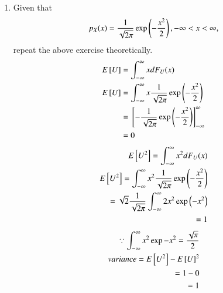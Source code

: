 \documentclass[journal,12pt,twocolumn]{IEEEtran}
\renewcommand\thesection{\arabic{section}}
\begin{document}
\begin{enumerate}[label=\thesection.\arabic*
,ref=\thesection.\theenumi]
\begin{lstlisting}
gcc -o out MV.c coeffs.h -lm
./out
\end{lstlisting}
\begin{lstlisting}
We get : Mean is 0.000685
        Variance is 1.000025
\end{lstlisting}
\item Given that 
\begin{align}
p_{X}(x) = \frac{1}{\sqrt{2\pi}}\exp\left(-\frac{x^2}{2}\right), -\infty < x < \infty,
\end{align}
repeat the above exercise theoretically.\\
\solution 
\begin{align}
E{}\left[U\right] & = \int_{-\infty}^{\infty}x dF_{U}(x)\\
E{}\left[U\right] & = \int_{-\infty}^{\infty}x \frac{1}{\sqrt{2\pi}}\exp\left(-\frac{x^2}{2}\right)\\ & = {}\left[-\frac{1}{\sqrt{2\pi}}\exp\left(-\frac{x^2}{2}\right)\right]_{-\infty}^{\infty}\\ & = 0
\end{align}
\begin{align}
E{}\left[U^2\right] = \int_{-\infty}^{\infty}x^2 dF_{U}(x) \\
E{}\left[U^2\right] = \int_{-\infty}^{\infty}x^2 \frac{1}{\sqrt{2\pi}}\exp\left(-\frac{x^2}{2}\right)\\ = \sqrt{2} \frac{1}{\sqrt{2\pi}} \int_{-\infty}^{\infty} 2x^2 \exp\left(-x^2\right)\\ = 1
\end{align}
\begin{align}
\because \int_{-\infty}^{\infty} x^2 \exp{-x^2} = \frac{\sqrt{\pi}}{2}\\
variance = E{}\left[U^2\right] - {E{}\left[U\right]}^2\\ = 1-0 \\ = 1
\end{align}
%
\end{enumerate}
\end{document}
